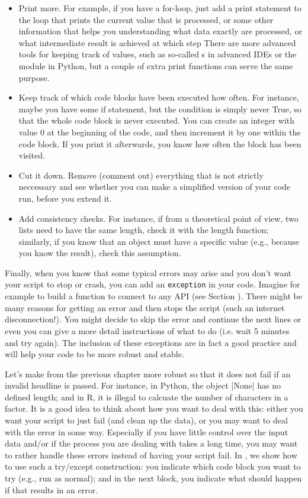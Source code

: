 \begin{itemize}
  \item Print more. For example, if you have a for-loop, just add a print statement to the loop that prints the current value that is processed, or some other information that helps you understanding what data exactly are processed, or what intermediate result is achieved at which step There are more advanced tools for keeping track of values, such as so-called s in advanced IDEs or the  module in Python, but a couple of extra print functions can serve the same purpose.
  \item Keep track of which code blocks have been executed how often. For instance, maybe you have some if statement, but the condition is simply never True, so that the whole code block is never executed. You can create an integer with value 0 at the beginning of the code, and then increment it by one within the code block. If you print it afterwards, you know how often the block has been visited.
  \item Cut it down. Remove (comment out) everything that is not strictly neccessary and see whether you can make a simplified version of your code run, before you extend it.
  \item Add consistency checks. For instance, if from a theoretical point of view, two lists need to have the same length, check it with the length function; similarly, if you know that an object must have a specific value (e.g., because you know the result), check this assumption.
\end{itemize}


Finally, when you know that some typical errors may arise and you don't want your script to stop or crash, you can add an \texttt{exception} in your code. Imagine for example to build a function to connect to any API (see Section ). There might be many reasons for getting an error and then stops the script (such an internet disconnection!). You might decide to skip  the error and continue the next lines or even you can give a more detail instructions of what to do (i.e. wait 5 minutes and try again). The inclusion of these exceptions are in fact a good practice and will help your code to be more robust and stable.

Let's make  from the previous chapter more robust so that it does not fail if an invalid headline is passed. For instance, in Python, the object |None| has no defined length; and in R, it is illegal to calcuate the number of characters in a factor. It is a good idea to think about how you want to deal with this: either you want your script to just fail (and clean up the data), or you may want to deal with the error in some way. Especially if you have little control over the input data and/or if the process you are dealing with takes a long time, you may want to rather handle these errors instead of having your script fail. In , we show how to use such a try/except construction: you indicate which code block you want to try (e.g., run as normal); and in the next block, you indicate what should happen if that results in an error.

